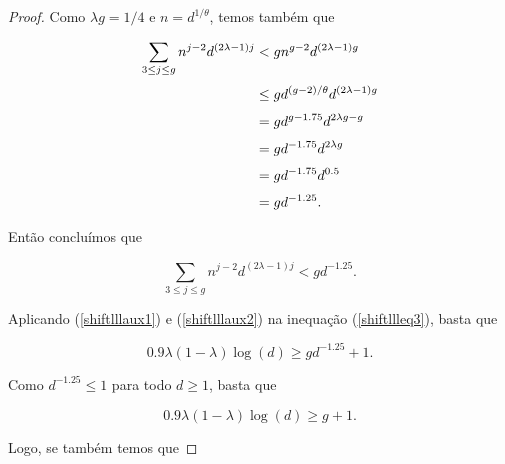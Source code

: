 \begin{proof}

Como $\lambda g = 1/4$ e $n = d^{1/\theta}$, temos também que

\begin{equation*}
\setlength{\jot}{6pt}
\begin{aligned}
\sum\limits_{3\leq j \leq g}n^{j-2}d^{(2\lambda-1)j} 
&< gn^{g-2}d^{(2\lambda-1)g} \\
&\leq gd^{(g-2)/\theta}d^{(2\lambda-1)g} \\
&= gd^{g-1.75}d^{2\lambda g-g} \\
&= gd^{-1.75}d^{2\lambda g} \\
&= gd^{-1.75}d^{0.5} \\
&= gd^{-1.25}.
\end{aligned}
\end{equation*}


Então concluímos que

\begin{equation}\label{shiftlllaux2}
\sum\limits_{3\leq j \leq g}n^{j-2}d^{(2\lambda-1)j} < gd^{-1.25}.
\end{equation}

Aplicando (\ref{shiftlllaux1}) e (\ref{shiftlllaux2}) na inequação  (\ref{shiftllleq3}), basta que

\[0.9\lambda(1-\lambda)\log(d) \geq gd^{-1.25} + 1.\]

Como $d^{-1.25} \leq 1$ para todo $d\geq 1$, basta que

\[0.9\lambda(1-\lambda)\log(d) \geq g + 1.\]

Logo, se também temos que


\end{proof}
